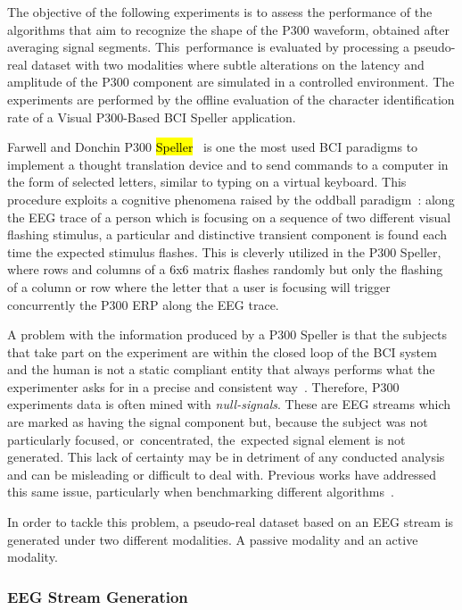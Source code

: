 \documentclass[brainsci,article,accept,moreauthors,pdftex,10pt,a4paper]{mdpi}
\begin{document}
The objective of the following experiments is to assess the performance of the algorithms that aim to recognize the shape of the P300 waveform, obtained after averaging signal segments.  This~performance is evaluated by processing a pseudo-real dataset with two modalities where subtle alterations on the latency and amplitude of the P300 component are simulated in a controlled environment.  The experiments are performed by the offline evaluation of the character identification rate of a Visual P300-Based BCI Speller application.

Farwell and Donchin P300 \hl{Speller}~\citep{Farwell1988,Rakotomamonjy2008} is one the most used BCI paradigms to implement a thought translation device and to send commands to a computer in the form of selected letters, similar to typing on a virtual keyboard.  This procedure exploits a cognitive phenomena raised by the oddball paradigm~\citep{Luck2005}: along the EEG trace of a person which is focusing on a sequence of two different visual flashing stimulus, a particular and distinctive transient component is found each time the expected stimulus flashes.  This is cleverly utilized in the P300 Speller, where rows and columns of a 6x6 matrix flashes randomly but only the flashing of a column or row where the letter that a user is focusing will trigger concurrently the P300 ERP along the EEG trace.

A problem with the information produced by a P300 Speller is that the subjects that take part on the experiment are within the closed loop of the BCI system and the human is  not a static compliant entity that always performs what the experimenter asks for in a precise and consistent way~\citep{Chavarriaga2017}.  Therefore, P300 experiments data is often mined with \textit{null-signals}.  These are EEG streams which are marked as having the signal component but, because the subject was not particularly focused, or~concentrated, the~expected signal element is not generated.   This lack of certainty may be in detriment of any conducted analysis and can be misleading or difficult to deal with.   Previous works have addressed this same issue, particularly when benchmarking different algorithms~\citep{Ouyang2017,Jaskowski2000,QuianQuiroga2003}.

In order to tackle this problem, a pseudo-real dataset based on an EEG stream is generated under two different modalities.  A passive modality and an active modality.

\subsubsection{EEG Stream Generation}
\label{EEGStream}
\end{document}
